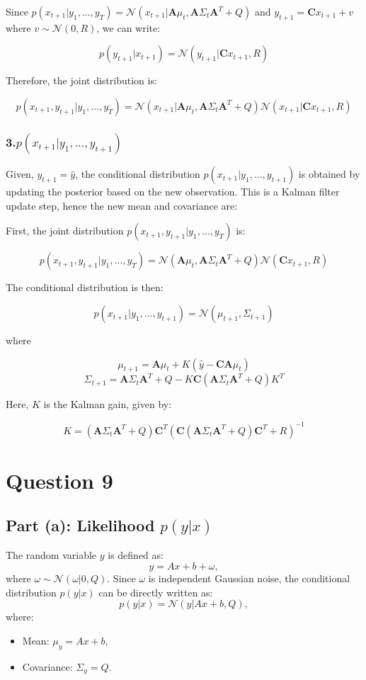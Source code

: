 \documentclass[12pt]{article}
\begin{document}
\begin{itemize}
Since \( p(x_{t+1} | y_1, \dots, y_T) = \mathcal{N}(x_{t+1} |\mathbf{A} \mu_t, \mathbf{A} \Sigma_t \mathbf{A}^T + Q) \) and \( y_{t+1} = \mathbf{C} x_{t+1} + v \) where \( v \sim \mathcal{N}(0, R) \), we can write:

\[
p(y_{t+1} | x_{t+1}) = \mathcal{N}(y_{t+1} |\mathbf{C} x_{t+1}, R)
\]

Therefore, the joint distribution is:

\[
p(x_{t+1}, y_{t+1} | y_1, \dots, y_T) = \mathcal{N}(x_{t+1} |\mathbf{A} \mu_t, \mathbf{A} \Sigma_t \mathbf{A}^T + Q) \mathcal{N}(x_{t+1} |\mathbf{C} x_{t+1}, R)
\]

\subsubsection*{3.\( p(x_{t+1} | y_1, \dots, y_{t+1}) \)}

Given, \( y_{t+1} = \hat{y} \), the conditional distribution \( p(x_{t+1} | y_1, \dots, y_{t+1}) \) is obtained by updating the posterior based on the new observation. This is a Kalman filter update step, hence the new mean and covariance are:

First, the joint distribution \( p(x_{t+1}, y_{t+1} | y_1, \dots, y_T) \) is:

\[
p(x_{t+1}, y_{t+1} | y_1, \dots, y_T) = \mathcal{N}(\mathbf{A} \mu_t, \mathbf{A} \Sigma_t \mathbf{A}^T + Q) \mathcal{N}(\mathbf{C} x_{t+1}, R)
\]

The conditional distribution is then:

\[
p(x_{t+1} | y_1, \dots, y_{t+1}) = \mathcal{N}(\mu_{t+1}, \Sigma_{t+1})
\]

where

\[
\mu_{t+1} = \mathbf{A} \mu_t + K (\hat{y} - \mathbf{C} \mathbf{A} \mu_t)
\]
\[
\Sigma_{t+1} = \mathbf{A} \Sigma_t \mathbf{A}^T + Q - K \mathbf{C} (\mathbf{A} \Sigma_t \mathbf{A}^T + Q) K^T
\]

Here, \( K \) is the Kalman gain, given by:

\[
K = (\mathbf{A} \Sigma_t \mathbf{A}^T + Q) \mathbf{C}^T (\mathbf{C} (\mathbf{A} \Sigma_t \mathbf{A}^T + Q) \mathbf{C}^T + R)^{-1}
\]


\section*{Question 9}

\subsection*{Part (a): Likelihood \( p(y|x) \)}
The random variable \( y \) is defined as:
\[
y = Ax + b + \omega,
\]
where \( \omega \sim \mathcal{N}(\omega | 0, Q) \). Since \( \omega \) is independent Gaussian noise, the conditional distribution \( p(y|x) \) can be directly written as:
\[
p(y|x) = \mathcal{N}(y | Ax + b, Q),
\]
where:
\begin{itemize}
    \item Mean: \( \mu_y = Ax + b \),
    \item Covariance: \( \Sigma_y = Q \).
\end{itemize}


\end{itemize}
\end{document}
